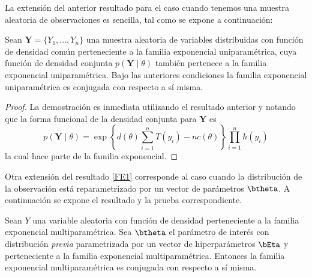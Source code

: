 \documentclass[10pt,openright]{book}\usepackage[]{graphicx}\usepackage[]{color}
\begin{document}
La extensión del anterior resultado para el caso cuando tenemos una muestra aleatoria de observaciones es sencilla, tal como se expone a continuación:
\begin{Res}
Sean $\mathbf{Y}=\{Y_1, \ldots, Y_n\}$ una muestra aleatoria de variables distribuidas con función de densidad común perteneciente a la familia exponencial uniparamétrica, cuya función de densidad conjunta $p(\mathbf{Y} \mid \theta)$ también pertenece a la familia exponencial uniparamétrica. Bajo las anteriores condiciones la familia exponencial uniparamétrica es conjugada con respecto a sí misma.
\end{Res}

\begin{proof}
La demostración es inmediata utilizando el resultado anterior y notando que la forma funcional de la densidad conjunta para $\mathbf{Y}$ es
\begin{equation}
p(\mathbf{Y} \mid \theta)=\exp\left\{d(\theta)\sum_{i=1}^nT(y_i)-nc(\theta)\right\}\prod_{i=1}^nh(y_i)
\end{equation}
la cual hace parte de la familia exponencial.
\end{proof}

Otra extensión del resultado \ref{FE1} corresponde al caso cuando la distribución de la observación está reparametrizado por un vector de parámetros $\btheta$. A continuación se expone el resultado y la prueba correspondiente.

\begin{Res}
Sean $Y$ una variable aleatoria con función de densidad perteneciente a la familia exponencial multiparamétrica. Sea $\btheta$ el parámetro de interés con distribución \emph{previa} parametrizada por un vector de hiperparámetros $\bEta$ y perteneciente a la familia exponencial multiparamétrica. Entonces la familia exponencial multiparamétrica es conjugada con respecto a sí misma.
\end{Res}
\end{document}
